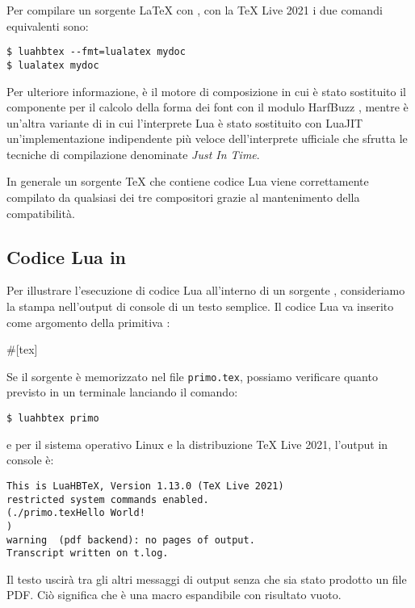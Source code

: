 Per compilare un sorgente \LaTeX{} con \LuaLaTeX{}, con la TeX Live 2021 i due
comandi equivalenti sono:
\begin{Verbatim}[numbers=none]
$ luahbtex --fmt=lualatex mydoc
$ lualatex mydoc
\end{Verbatim}

Per ulteriore informazione,  è il motore di composizione
 in cui è stato sostituito il componente per il calcolo della forma
dei font con il modulo HarfBuzz \cite{lib:harfbuzz}, mentre  è
un'altra variante di  in cui l'interprete Lua è stato sostituito
con LuaJIT \cite{prg:luajit} un'implementazione indipendente più veloce
dell'interprete ufficiale che sfrutta le tecniche di compilazione denominate
\emph{Just In Time}.

In generale un sorgente \TeX{} che contiene codice Lua viene correttamente
compilato da qualsiasi dei tre compositori grazie al mantenimento della
compatibilità.


\subsection{Codice Lua in \LuaTeX}
\label{iChLuaInLuaTeX}

Per illustrare l'esecuzione di codice Lua all'interno di un sorgente \LuaTeX,
consideriamo la stampa nell'output di console di un testo semplice. Il codice
Lua va inserito come argomento della primitiva :
\begin{lines}
#[tex]
\bye
\end{lines}

Se il sorgente è memorizzato nel file \texttt{primo.tex}, possiamo verificare
quanto previsto in un terminale lanciando il comando:
\begin{Verbatim}[numbers=none]
$ luahbtex primo
\end{Verbatim}
e per il sistema operativo Linux e la distribuzione TeX Live 2021, l'output
in console è:
\begin{Verbatim}
This is LuaHBTeX, Version 1.13.0 (TeX Live 2021) 
restricted system commands enabled.
(./primo.texHello World!
)
warning  (pdf backend): no pages of output.
Transcript written on t.log.  
\end{Verbatim}

Il testo uscirà tra gli altri messaggi di output senza che sia stato prodotto un
file PDF. Ciò significa che  è una macro espandibile con risultato
vuoto.


